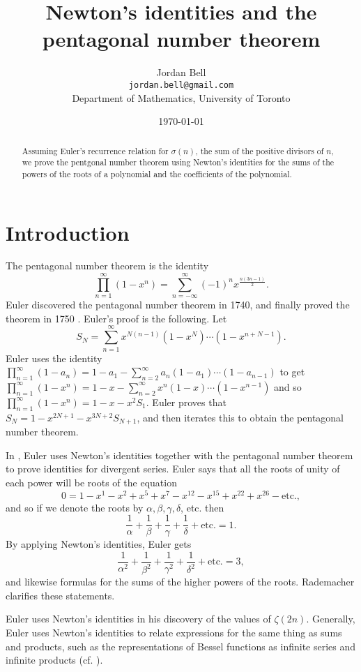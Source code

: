 \documentclass{article}
\begin{document}
\title{Newton's identities and the pentagonal number theorem}
\author{Jordan Bell\\ \texttt{jordan.bell@gmail.com}\\Department of Mathematics, University of Toronto}
\date{\today}
\maketitle
\begin{abstract}
Assuming Euler's recurrence relation for $\sigma(n)$, the sum of the positive
divisors of $n$,
we prove the pentgonal number theorem using Newton's identities for the sums
of the powers of the roots of a polynomial and the coefficients of the
polynomial.
\end{abstract}

\section{Introduction}
The pentagonal number theorem is the identity
\[
\prod_{n=1}^\infty (1-x^n)=\sum_{n=-\infty}^\infty (-1)^n x^{\frac{n(3n-1)}{2}}.
\]
Euler discovered the pentagonal number theorem in 1740, and finally proved
the theorem in 1750 \cite{bell}. Euler's proof is the following.
Let
\[
S_N=\sum_{n=1}^\infty x^{N(n-1)}(1-x^N)\cdots(1-x^{n+N-1}).
\]
Euler uses the identity $\prod_{n=1}^\infty (1-a_n)=
1-a_1-\sum_{n=2}^\infty a_n(1-a_1)\cdots(1-a_{n-1})$ to get
$\prod_{n=1}^\infty (1-x^n)=1-x-\sum_{n=2}^\infty x^n(1-x)\cdots(1-x^{n-1})$
and so $\prod_{n=1}^\infty (1-x^n)=1-x-x^2S_1$.
Euler proves that $S_N=1-x^{2N+1}-x^{3N+2}S_{N+1}$, and then iterates this
to obtain
the pentagonal number theorem.

In \cite{E542},
Euler uses Newton's identities together with the pentagonal number theorem
to prove identities for divergent series.
Euler says that all the roots of unity of each power will be roots
of the equation
\[
0=1-x^1-x^2+x^5+x^7-x^{12}-x^{15}+x^{22}+x^{26}-\textrm{etc.},
\]
and so if we denote the roots by $\alpha,\beta,\gamma,\delta$, etc. then
\[
\frac{1}{\alpha}+\frac{1}{\beta}+\frac{1}{\gamma}+\frac{1}{\delta}+\textrm{etc.}=1.
\]
By applying Newton's identities, Euler gets
\[
\frac{1}{\alpha^2}+\frac{1}{\beta^2}+\frac{1}{\gamma^2}+
\frac{1}{\delta^2}+\textrm{etc.}=3,
\]
and likewise formulas for the sums of the higher powers of the roots.
Rademacher \cite{MR0262045}
clarifies these statements.

Euler uses Newton's identities
in his discovery of the values of $\zeta(2n)$.
Generally, Euler uses Newton's identities to relate expressions
for the same thing as sums and products,
such as the representations of Bessel functions as infinite
series and infinite products (cf. \cite[pp. 497--503]{watson}).
\end{document}
